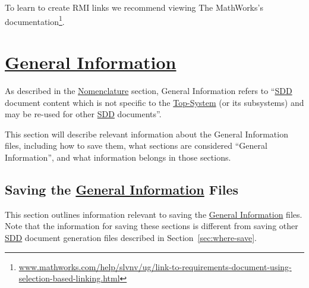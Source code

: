 \documentclass{mcscert}
\newcommand{\mathworks}{The MathWorks}
\newcommand{\topsystemnolink}{Top-System} %
\newcommand{\topsystem}{\hyperref[def:topsystem]{\topsystemnolink{}}}
\newcommand{\geninfonolink}{General Information}
\newcommand{\geninfo}{\hyperref[def:general-info]{\geninfonolink{}}}
\begin{document}
	To learn to create RMI links we recommend viewing \mathworks{}'s documentation\footnote{\href{https://www.mathworks.com/help/slvnv/ug/link-to-requirements-document-using-selection-based-linking.html}{www.mathworks.com/help/slvnv/ug/link-to-requirements-document-using-selection-based-linking.html}}.

\section{\geninfo{}}
\label{sec:general-info}
As described in the \hyperref[sec:nomenclature]{Nomenclature} section, \geninfonolink{} refers to ``\hyperref[acr:sdd]{SDD} document content which is not specific to the \topsystem{} (or its subsystems) and may be re-used for other \hyperref[acr:sdd]{SDD} documents''.
	
This section will describe relevant information about the \geninfonolink{} files, including how to save them, what sections are considered ``\geninfonolink{}'', and what information belongs in those sections.%
	
	\subsection{Saving the \geninfo{} Files}
	This section outlines information relevant to saving the \geninfo{} files. 
	Note that the information for saving these sections is different from saving other \hyperref[acr:sdd]{SDD} document generation files described in Section~\ref{sec:where-save}.
\end{document}
